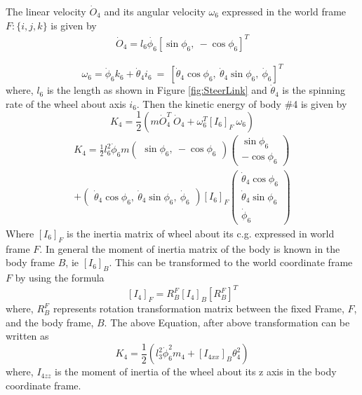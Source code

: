 {  The linear velocity $\dot{O}_4$  and its angular velocity $\omega_6$  expressed in the world frame $F:\{i,j,k\}$ is given by
 \begin{eqnarray}
 \dot{O}_4=l_6\dot{\phi_6}[\sin\phi_6, ~ -\cos\phi_6] ^T
 \end{eqnarray}
 
 \begin{equation}
 \omega_6=\dot\phi_6k_6+\dot\theta_4i_6 ~=~ [\dot\theta_4\cos\phi_6,~ \dot\theta_4\sin\phi_6,~ \dot\phi_6]^T
 \end{equation} where, $l_6$ is the length as shown in Figure \ref{fig:SteerLink}  and $\dot\theta_4$ is the spinning rate of the wheel about axis $i_6$.
 Then the kinetic energy of body \#4 is given by
\begin{equation}
 K_4=\frac{1}{2}(m\dot O_4 ^T ~\dot O_4+ \omega_6^T [I_6]_F~\omega_6  )
 \end{equation}
 \begin{multline}
 K_4=\frac{1}{2} l_6^2 \dot\phi_6 m \begin{pmatrix}
 \sin\phi_6, ~ -\cos\phi_6
 \end{pmatrix}
 \begin{pmatrix}
 \sin\phi_6\\ -\cos\phi_6
 \end{pmatrix}\\
 + 
 \begin{pmatrix}
 \dot\theta_4 \cos\phi_6, ~ \dot\theta_4 \sin\phi_6, ~\dot\phi_6
 \end{pmatrix}[I_6]_F
 \begin{pmatrix}
 \dot\theta_4 \cos\phi_6\\ \dot\theta_4 \sin\phi_6\\ \dot\phi_6
 \end{pmatrix}
 \end{multline} Where $[I_6]_F$ is the inertia matrix of wheel about its c.g. expressed in world frame $F$.
 In general the moment of inertia matrix of the body is known in the body frame $B$, ie $[I_6]_B$. This can be transformed to the world coordinate frame $F$ by using the formula
 \[ [I_4]_F=R^F_B[I_4]_B [R^F_B]^T\] where, $R^F_B$ represents rotation transformation matrix between the fixed Frame, $F$, and the body frame, $B$. 
 The above Equation, after above transformation can be written as
 \begin{equation}
 K_4=\frac{1}{2}(l_3^2\dot\phi_6^2m_4+[I_{4xx}]_B\theta_4^2)
 \end{equation} 
where, $I_{4zz} $ is the moment of inertia of the wheel about its z axis in the body coordinate frame.

}
